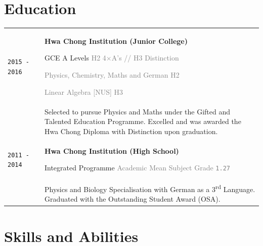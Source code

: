 \documentclass[11pt]{article}
\newcommand{\nummer}[1]{\texttt{\large #1}}
\begin{document}
\section{\textcolor{section_1}{Education}}
\vspace{-\baselineskip}
{
	\renewcommand{\arraystretch}{2}
	\begin{tabularx}{\textwidth}{@{}l p{0.3cm} X@{}}
		\texttt{\large 2015 - 2016} & & \textbf{Hwa Chong Institution (Junior College)}\par GCE A Levels \hfill \textcolor{gray}{H2 4$\times$A's // H3 Distinction}\par \hfill \textcolor{gray}{{\scriptsize Physics, Chemistry, Maths and German} \hspace{1em} H2}\par \hfill \textcolor{gray}{{\scriptsize Linear Algebra [NUS]} \hspace{1em} H3} \\[-0.5em]
		&& {\small Selected to pursue Physics and Maths under the Gifted and Talented Education Programme. Excelled and was awarded the Hwa Chong Diploma with Distinction upon graduation.} \\
		\texttt{\large 2011 - 2014} & & \textbf{Hwa Chong Institution (High School)} \par Integrated Programme \hfill \textcolor{gray}{{\scriptsize Academic Mean Subject Grade} \nummer{\large 1.27}} \\[-0.5em]
		&& {\small Physics and Biology Specialisation with German as a 3\textsuperscript{rd} Language. Graduated with the Outstanding Student Award {\footnotesize (OSA)}. }
	\end{tabularx}
}


\section{\textcolor{section_4}{Skills and Abilities}}
\vspace{-\parskip}
\end{document}
